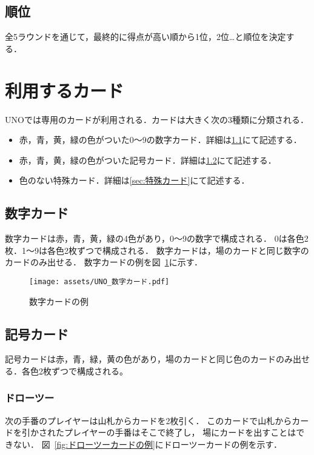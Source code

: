 \documentclass[11pt]{ltjsarticle}
\newcommand{\figref}[1]{図~\ref{#1}}
\begin{document}
\subsection{順位}
全5ラウンドを通じて，最終的に得点が高い順から1位，2位…と順位を決定する\cite{日本ウノ協会公認ルール}．


\section{利用するカード}
UNOでは専用のカードが利用される．カードは大きく次の3種類に分類される．

\begin{itemize}
  \item 赤，青，黄，緑の色がついた0～9の数字カード．詳細は\ref{sec:数字カード}にて記述する．
  \item 赤，青，黄，緑の色がついた記号カード．詳細は\ref{sec:記号カード}にて記述する．
  \item 色のない特殊カード．詳細は\ref{sec:特殊カード}にて記述する．
\end{itemize}

\subsection{数字カード}
\label{sec:数字カード}
数字カードは赤，青，黄，緑の4色があり，0～9の数字で構成される．
0は各色2枚．1～9は各色2枚ずつで構成される．
数字カードは，場のカードと同じ数字のカードのみ出せる．
数字カードの例を\figref{fig:数字カードの例}に示す．

\begin{figure}[h]
  \begin{center}
    \texttt{[image: assets/UNO\_数字カード.pdf]}
    \caption{数字カードの例}
    \label{fig:数字カードの例}
  \end{center}
\end{figure}


\newpage

\subsection{記号カード}
\label{sec:記号カード}
記号カードは赤，青，緑，黄の色があり，場のカードと同じ色のカードのみ出せる．各色2枚ずつで構成される\cite{日本ウノ協会公認ルール}。

\subsubsection{ドローツー}
次の手番のプレイヤーは山札からカードを2枚引く．
このカードで山札からカードを引かされたプレイヤーの手番はそこで終了し，
場にカードを出すことはできない\cite{日本ウノ協会公認ルール}．
\figref{fig:ドローツーカードの例}にドローツーカードの例を示す．
\end{document}
